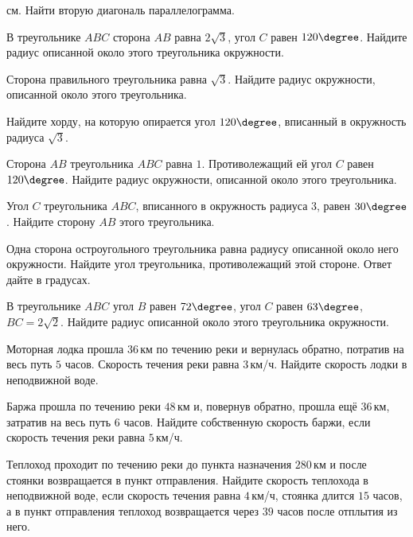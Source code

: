 \begin{class}[number=2]
\begin{listofex}[resume]
		см. Найти вторую диагональ параллелограмма.
		\item В треугольнике \( ABC \) сторона \( AB \) равна \( 2\sqrt{3} \), угол \( C \) равен \( 120\degree \). Найдите радиус описанной около этого треугольника окружности.
		\item Сторона правильного треугольника равна \( \sqrt{3} \). Найдите радиус окружности, описанной около этого треугольника.
		\item Найдите хорду, на которую опирается угол \( 120\degree \), вписанный в окружность радиуса \( \sqrt{3} \).  
		\item Сторона \( AB \) треугольника \( ABC \) равна \( 1 \). Противолежащий ей угол \( C \) равен \( 120\degree \). Найдите радиус окружности, описанной около этого треугольника.
		\item Угол \( C \) треугольника \( ABC \), вписанного в окружность радиуса \( 3 \), равен \( 30\degree \). Найдите сторону \( AB \) этого треугольника.
		\item Одна сторона остроугольного треугольника равна радиусу описанной около него окружности. Найдите угол треугольника, противолежащий этой стороне. Ответ дайте в градусах.
		\item В треугольнике \( ABC \) угол \( B \) равен \( 72\degree \), угол \( C \) равен \( 63\degree \), \( BC=2\sqrt{2} \). Найдите радиус описанной около этого треугольника окружности.
		\item Моторная лодка прошла \( 36 \) км по течению реки и вернулась обратно, потратив на весь путь \( 5 \) часов. Скорость течения реки равна \( 3 \) км/ч. Найдите скорость лодки в неподвижной воде.
		\item Баржа прошла по течению реки \( 48 \) км и, повернув обратно, прошла ещё \( 36 \) км, затратив на весь путь \( 6 \) часов. Найдите собственную скорость баржи, если скорость течения реки равна \( 5 \) км/ч.
		\item Теплоход проходит по течению реки до пункта назначения \( 280 \) км и после стоянки возвращается в пункт отправления. Найдите скорость теплохода в неподвижной воде, если скорость течения равна \( 4 \) км/ч, стоянка длится \( 15 \) часов, а в пункт отправления теплоход возвращается через \( 39 \) часов после отплытия из него.
	\end{listofex}
\end{class}

